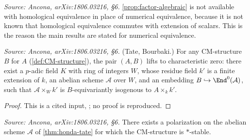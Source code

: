 \begin{remark}
  \label{rem:num-vs-hom}
  \textit{Source: Ancona, arXiv:1806.03216, §6.}
  \cref{prop:factor-algebraic} is not available with homological equivalence in
  place of numerical equivalence, because it is not known that homological
  equivalence commutes with extension of scalars. This is the reason the main
  results are stated for numerical equivalence.
\end{remark}

\begin{theorem}
  \label{thm:honda-tate}
  \textit{Source: Ancona, arXiv:1806.03216, §6.}
  (Tate, Bourbaki.) For any CM-structure \(B\) for \(A\)
  (\cref{def:CM-structure}), the pair \((A, B)\) lifts to characteristic zero:
  there exist a \(p\)-adic field \(K\) with ring of integers \(W\), whose residue
  field \(k'\) is a finite extension of \(k\), an abelian scheme \(\mathcal{A}\)
  over \(W\), and an embedding \(B \hookrightarrow \End^0(\mathcal{A})\), such
  that \(\mathcal{A} \times_W k'\) is \(B\)-equivariantly isogenous to
  \(A \times_k k'\).
\end{theorem}

\begin{proof}
  This is a cited input, \cite[Theorem 2]{TateBour}; no proof is reproduced.
\end{proof}

\begin{corollary}
  \label{cor:cm-stable}
  \textit{Source: Ancona, arXiv:1806.03216, §6.}
  There exists a polarization on the abelian scheme \(\mathcal{A}\) of
  \cref{thm:honda-tate} for which the CM-structure is \(*\)-stable.
\end{corollary}

